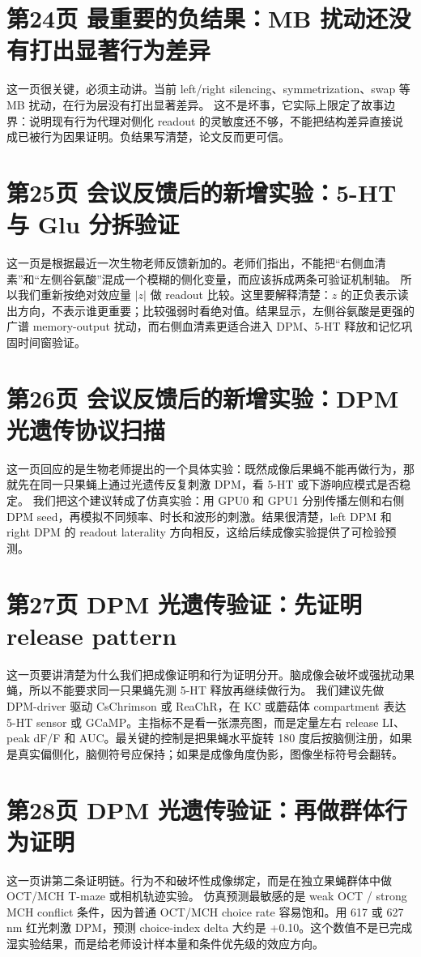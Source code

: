 \documentclass[11pt,fontset=none]{ctexart}
\begin{document}
\section*{第24页 最重要的负结果：MB 扰动还没有打出显著行为差异}
这一页很关键，必须主动讲。当前 left/right silencing、symmetrization、swap 等 MB 扰动，在行为层没有打出显著差异。
这不是坏事，它实际上限定了故事边界：说明现有行为代理对侧化 readout 的灵敏度还不够，不能把结构差异直接说成已被行为因果证明。负结果写清楚，论文反而更可信。
\section*{第25页 会议反馈后的新增实验：5-HT 与 Glu 分拆验证}
这一页是根据最近一次生物老师反馈新加的。老师们指出，不能把“右侧血清素”和“左侧谷氨酸”混成一个模糊的侧化变量，而应该拆成两条可验证机制轴。
所以我们重新按绝对效应量 $|z|$ 做 readout 比较。这里要解释清楚：$z$ 的正负表示读出方向，不表示谁更重要；比较强弱时看绝对值。结果显示，左侧谷氨酸是更强的广谱 memory-output 扰动，而右侧血清素更适合进入 DPM、5-HT 释放和记忆巩固时间窗验证。
\section*{第26页 会议反馈后的新增实验：DPM 光遗传协议扫描}
这一页回应的是生物老师提出的一个具体实验：既然成像后果蝇不能再做行为，那就先在同一只果蝇上通过光遗传反复刺激 DPM，看 5-HT 或下游响应模式是否稳定。
我们把这个建议转成了仿真实验：用 GPU0 和 GPU1 分别传播左侧和右侧 DPM seed，再模拟不同频率、时长和波形的刺激。结果很清楚，left DPM 和 right DPM 的 readout laterality 方向相反，这给后续成像实验提供了可检验预测。
\section*{第27页 DPM 光遗传验证：先证明 release pattern}
这一页要讲清楚为什么我们把成像证明和行为证明分开。脑成像会破坏或强扰动果蝇，所以不能要求同一只果蝇先测 5-HT 释放再继续做行为。
我们建议先做 DPM-driver 驱动 CsChrimson 或 ReaChR，在 KC 或蘑菇体 compartment 表达 5-HT sensor 或 GCaMP。主指标不是看一张漂亮图，而是定量左右 release LI、peak dF/F 和 AUC。最关键的控制是把果蝇水平旋转 180 度后按脑侧注册，如果是真实偏侧化，脑侧符号应保持；如果是成像角度伪影，图像坐标符号会翻转。
\section*{第28页 DPM 光遗传验证：再做群体行为证明}
这一页讲第二条证明链。行为不和破坏性成像绑定，而是在独立果蝇群体中做 OCT/MCH T-maze 或相机轨迹实验。
仿真预测最敏感的是 weak OCT / strong MCH conflict 条件，因为普通 OCT/MCH choice rate 容易饱和。用 617 或 627 nm 红光刺激 DPM，预测 choice-index delta 大约是 +0.10。这个数值不是已完成湿实验结果，而是给老师设计样本量和条件优先级的效应方向。
\end{document}
